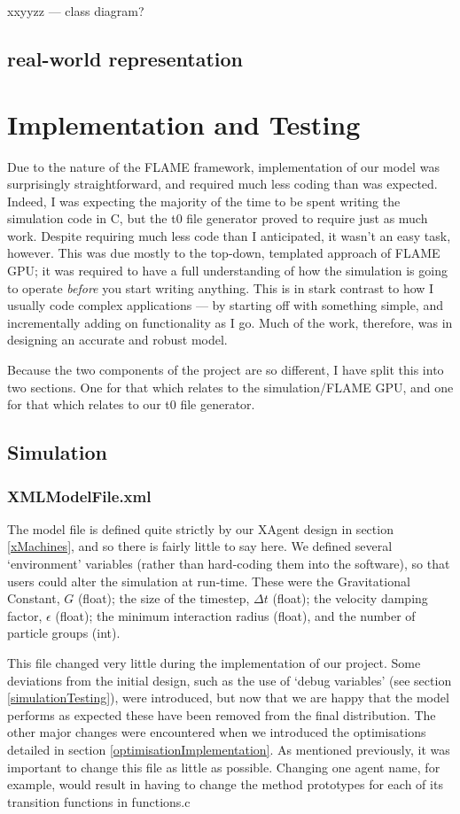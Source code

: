 \documentclass[11pt,a4paper]{article}
\begin{document}
xxyyzz --- class diagram?
\subsection{real-world representation}

\section{Implementation and Testing}
Due to the nature of the FLAME framework, implementation of our model was surprisingly straightforward, and required much less coding than was expected. Indeed, I was expecting the majority of the time to be spent writing the simulation code in C, but the t0 file generator proved to require just as much work. Despite requiring much less code than I anticipated, it wasn't an easy task, however. This was due mostly to the top-down, templated approach of FLAME GPU; it was required to have a full understanding of how the simulation is going to operate \emph{before} you start writing anything. This is in stark contrast to how I usually code complex applications --- by starting off with something simple, and incrementally adding on functionality as I go. Much of the work, therefore, was in designing an accurate and robust model.

Because the two components of the project are so different, I have split this into two sections. One for that which relates to the simulation/FLAME GPU, and one for that which relates to our t0 file generator.
\subsection{Simulation}

\subsubsection{XMLModelFile.xml}

The model file is defined quite strictly by our XAgent design in section \ref{xMachines}, and so there is fairly little to say here. We defined several `environment' variables (rather than hard-coding them into the software), so that users could alter the simulation at run-time. These were the Gravitational Constant, $G$ (float); the size of the timestep, $\Delta t$ (float); the velocity damping factor, $\epsilon$ (float); the minimum interaction radius (float), and the number of particle groups (int).

This file changed very little during the implementation of our project. Some deviations from the initial design, such as the use of `debug variables' (see section  \ref{simulationTesting}), were introduced, but now that we are happy that the model performs as expected these have been removed from the final distribution. The other major changes were encountered when we introduced the optimisations detailed in section \ref{optimisationImplementation}. As mentioned previously, it was important to change this file as little as possible. Changing one agent name, for example, would result in having to change the method prototypes for each of its transition functions in functions.c
\end{document}
